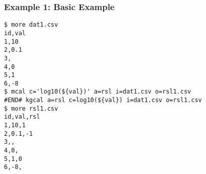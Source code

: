 \subsubsection*{Example 1: Basic Example}



\begin{Verbatim}[baselinestretch=0.7,frame=single]
$ more dat1.csv
id,val
1,10
2,0.1
3,
4,0
5,1
6,-8
$ mcal c='log10(${val})' a=rsl i=dat1.csv o=rsl1.csv
#END# kgcal a=rsl c=log10(${val}) i=dat1.csv o=rsl1.csv
$ more rsl1.csv
id,val,rsl
1,10,1
2,0.1,-1
3,,
4,0,
5,1,0
6,-8,
\end{Verbatim}
